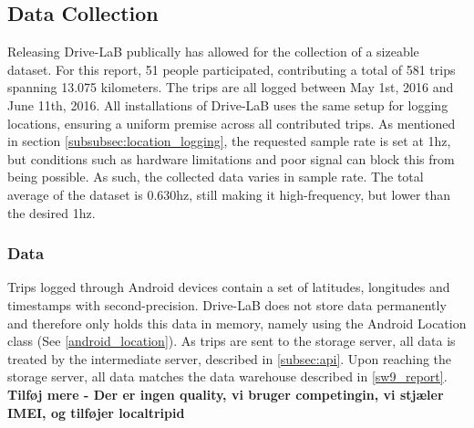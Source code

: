 \subsection{Data Collection}\label{sec:datacollection}
Releasing Drive-LaB publically has allowed for the collection of a sizeable dataset. For this report, 51 people participated, contributing a total of 581 trips spanning 13.075 kilometers. The trips are all logged between May 1st, 2016 and June 11th, 2016. All installations of Drive-LaB uses the same setup for logging locations, ensuring a uniform premise across all contributed trips. As mentioned in section \ref{subsubsec:location_logging}, the requested sample rate is set at 1hz, but conditions such as hardware limitations and poor signal can block this from being possible. As such, the collected data varies in sample rate. The total average of the dataset is 0.630hz, still making it high-frequency, but lower than the desired 1hz.

\subsubsection{Data}\label{subsec:data}
Trips logged through Android devices contain a set of latitudes, longitudes and timestamps with second-precision. Drive-LaB does not store data permanently and therefore only holds this data in memory, namely using the Android Location class (See \ref{android_location}). As trips are sent to the storage server, all data is treated by the intermediate server, described in \ref{subsec:api}. Upon reaching the storage server, all data matches the data warehouse described in \ref{sw9_report}. \textbf{Tilføj mere - Der er ingen quality, vi bruger competingin, vi stjæler IMEI, og tilføjer localtripid} 